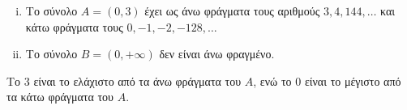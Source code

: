 \documentclass[main.tex]{subfiles}
\begin{document}
\begin{example}
\item {}
    \begin{enumerate}[i)]
        \item Το  σύνολο $ A = (0,3) $  έχει ως άνω φράγματα τους αριθμούς 
            $ 3, 4, 144, \ldots$ και κάτω φράγματα τους 
            $ 0, -1, -2, -128, \ldots $ 

        \item Το σύνολο $ B = (0,+\infty) $ δεν είναι άνω φραγμένο.
    \end{enumerate}
\end{example}

\begin{rem}
    Το  $ 3 $ είναι το ελάχιστο από τα άνω φράγματα του $A$, ενώ το $ 0
    $ είναι το μέγιστο από τα κάτω φράγματα του $A$. 
\end{rem}



\end{document}
